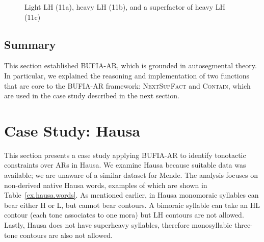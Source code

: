 \documentclass{CUP-JNL-PHO}%
\theoremstyle{definition}
\numberwithin{equation}{section}
\theoremstyle{definition}
\begin{document}
\begin{figure}[ht]
\begin{subfigure}[t]{0.3\textwidth}
		\subcaption{}
		\label{fig:matrix-super}
	\end{subfigure}
	\hfill
	\caption{Light LH (11a), heavy LH (11b), 
	and a superfactor of heavy LH (11c)}
	\label{fig:matrixmatching}
\end{figure}


\subsection{Summary}
This section established BUFIA-AR, which is grounded in autosegmental 
theory. In particular, we explained the reasoning and implementation 
of two functions that are core to the BUFIA-AR framework: 
\textsc{NextSupFact} and \textsc{Contain}, which are 
used in the case study described in the next section.


\section{Case Study: Hausa} \label{sec:hausa}

This section presents a case study applying BUFIA-AR to identify
tonotactic constraints over ARs in Hausa. We examine Hausa because
suitable data was available; we are unaware of a similar dataset for
Mende. The analysis focuses on non-derived native Hausa words,
examples of which are shown in Table~\ref{ex.hausa.words}. As mentioned
earlier, in Hausa monomoraic syllables can bear either H or L, but
cannot bear contours. A bimoraic syllable can take an HL contour (each
tone associates to one mora) but LH contours are not allowed. Lastly,
Hausa does not have superheavy syllables, therefore monosyllabic
three-tone contours are also not allowed.  
\end{document}
